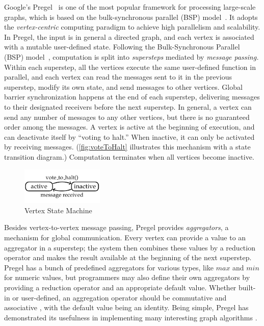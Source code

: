 \documentclass{sokendai_thesis} %
\begin{document}
Google's Pregel~\cite{pregel} is one of the most popular framework for processing large-scale graphs, which is based on the bulk-synchronous parallel (BSP) model~\cite{bsp}.
It adopts the \emph{vertex-centric} computing paradigm to achieve high parallelism and scalability.
In Pregel, the input is in general a directed graph, and each vertex is associated with a mutable user-defined state.
Following the Bulk-Synchronous Parallel (BSP) model~\cite{bsp}, computation is split into \emph{supersteps} mediated by \emph{message passing.}
Within each superstep, all the vertices execute the same user-defined function in parallel, and each vertex can read the messages sent to it in the previous superstep, modify its own state, and send messages to other vertices.
Global barrier synchronization happens at the end of each superstep, delivering messages to their designated receivers before the next superstep.
In general, a vertex can send any number of messages to any other vertices, but there is no guaranteed order among the messages.
A vertex is active at the beginning of execution, and can deactivate itself by ``voting to halt.''
When inactive, it can only be activated by receiving messages.
(\autoref{fig:voteToHalt} illustrates this mechanism with a state transition diagram.)
Computation terminates when all vertices become inactive. %
\begin{figure}[ht]
 \centering
 \includegraphics[width=0.35\textwidth]{figures/active.pdf}
 \caption{Vertex State Machine}
 \label{fig:voteToHalt}
\end{figure}

Besides vertex-to-vertex message passing, Pregel provides \emph{aggregators}, a mechanism for global communication.
Every vertex can provide a value to an aggregator in a superstep; the system then combines these values by a reduction operator and makes the result available at the beginning of the next superstep.
Pregel has a bunch of predefined aggregators for various types, like $\mathit{max}$ and $\mathit{min}$ for numeric values, but programmers may also define their own aggregators by providing a reduction operator and an appropriate default value.
Whether built-in or user-defined, an aggregation operator should be commutative and associative , with the default value being an identity.
Being simple, Pregel has demonstrated its usefulness in implementing many interesting graph algorithms \cite{pregel,QuWH12,connectivity,optimizing,XiYZ14}.
\end{document}

